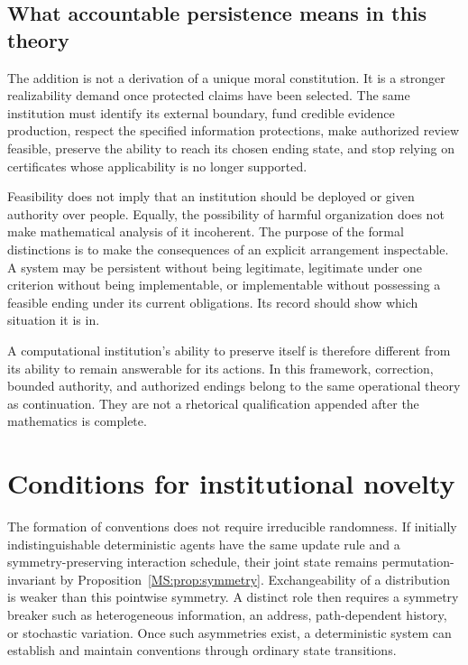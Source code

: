 \subsection{What accountable persistence means in this theory}

The addition is not a derivation of a unique moral constitution. It is a stronger realizability demand once protected claims have been selected. The same institution must identify its external boundary, fund credible evidence production, respect the specified information protections, make authorized review feasible, preserve the ability to reach its chosen ending state, and stop relying on certificates whose applicability is no longer supported.

Feasibility does not imply that an institution should be deployed or given authority over people. Equally, the possibility of harmful organization does not make mathematical analysis of it incoherent. The purpose of the formal distinctions is to make the consequences of an explicit arrangement inspectable. A system may be persistent without being legitimate, legitimate under one criterion without being implementable, or implementable without possessing a feasible ending under its current obligations. Its record should show which situation it is in.

A computational institution's ability to preserve itself is therefore different from its ability to remain answerable for its actions. In this framework, correction, bounded authority, and authorized endings belong to the same operational theory as continuation. They are not a rhetorical qualification appended after the mathematics is complete.



\FloatBarrier
\section{Conditions for institutional novelty}\label{MS:sec:novelty}

The formation of conventions does not require irreducible randomness. If initially indistinguishable deterministic agents have the same update rule and a symmetry-preserving interaction schedule, their joint state remains permutation-invariant by Proposition~\ref{MS:prop:symmetry}. Exchangeability of a distribution is weaker than this pointwise symmetry. A distinct role then requires a symmetry breaker such as heterogeneous information, an address, path-dependent history, or stochastic variation. Once such asymmetries exist, a deterministic system can establish and maintain conventions through ordinary state transitions.

